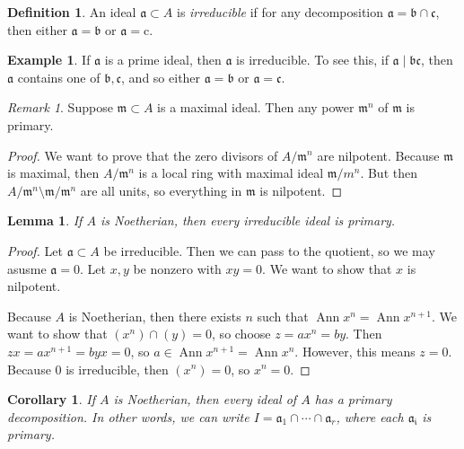 \documentclass[leqno, openany]{memoir}
\newtheorem{cor}[thm]{Corollary}
\newtheorem{lem}[thm]{Lemma}
\theoremstyle{definition}
\newtheorem{defn}[thm]{Definition}
\newtheorem{exm}[thm]{Example}
\theoremstyle{remark}
\newtheorem{rmk}[thm]{Remark}
\theoremstyle{plain}
\theoremstyle{definition}
\theoremstyle{remark}
\newcommand{\mf}[1]{\mathfrak{#1}}
\newcommand{\mr}[1]{\mathrm{#1}}
\begin{document}
\begin{defn}
    An ideal $\mf{a} \subset A$ is \textit{irreducible} if for any decomposition $\mf{a} = \mf{b} \cap \mf{c}$, then either $\mf{a} = \mf{b}$ or $\mf{a} = \mr{c}$.
\end{defn}

\begin{exm}
    If $\mf{a}$ is a prime ideal, then $\mf{a}$ is irreducible. To see this, if $\mf{a} \mid \mf{bc}$, then $\mf{a}$ contains one of $\mf{b}, \mf{c}$, and so either $\mf{a} = \mf{b}$ or $\mf{a} = \mf{c}$.
\end{exm}

\begin{rmk}
    Suppose $\mf{m} \subset A$ is a maximal ideal. Then any power $\mf{m}^n$ of $\mf{m}$ is primary.
\end{rmk}

\begin{proof}
    We want to prove that the zero divisors of $A / \mf{m}^n$ are nilpotent. Because $\mf{m}$ is maximal, then $A / \mf{m}^n$ is a local ring with maximal ideal $\mf{m} / m^n$. But then $A / \mf{m}^n \setminus \mf{m} / \mf{m}^n$ are all units, so everything in $\mf{m}$ is nilpotent.
\end{proof}

\begin{lem}
    If $A$ is Noetherian, then every irreducible ideal is primary.
\end{lem}

\begin{proof}
    Let $\mf{a} \subset A$ be irreducible. Then we can pass to the quotient, so we may asusme $\mf{a} = 0$. Let $x,y$ be nonzero with $xy = 0$. We want to show that $x$ is nilpotent.

    Because $A$ is Noetherian, then there exists $n$ such that $\operatorname{Ann} x^n = \operatorname{Ann} x^{n+1}$. We want to show that $(x^n) \cap (y) = 0$, so choose $z = ax^n = by$. Then $zx = ax^{n+1} = byx = 0$, so $a \in \operatorname{Ann} x^{n+1} = \operatorname{Ann} x^n$. However, this means $z = 0$. Because $0$ is irreducible, then $(x^n) = 0$, so $x^n = 0$.
\end{proof}

\begin{cor}
    If $A$ is Noetherian, then every ideal of $A$ has a primary decomposition. In other words, we can write $I = \mf{a}_1 \cap  \cdots \cap \mathfrak{a}_r$, where each $\mf{a_i}$ is primary. 
\end{cor}
\end{document}
